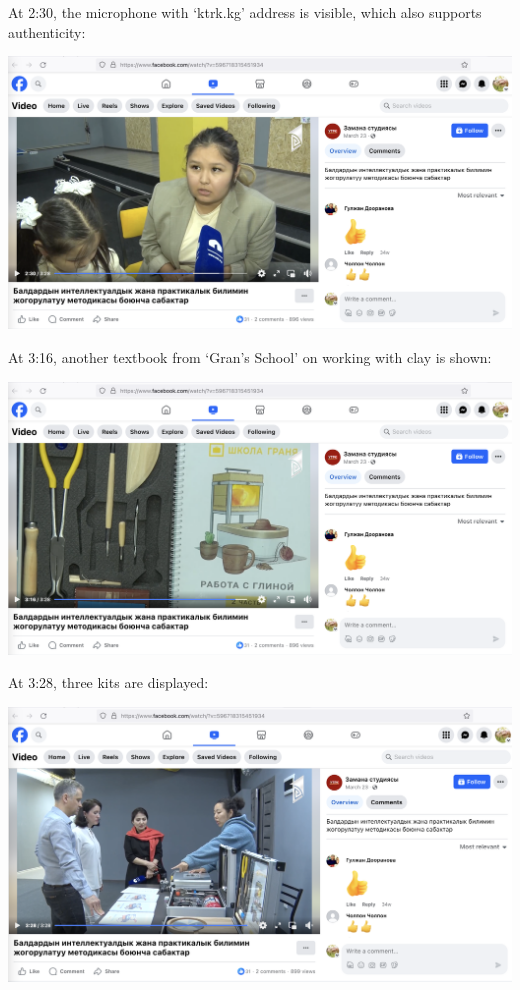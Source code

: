 

At 2:30, the microphone with `ktrk.kg' address is visible, which also supports authenticity:

\includegraphics[width=\textwidth]{2_30_girls}



At 3:16, another textbook from `Gran's School' on working with clay is shown:

\includegraphics[width=\textwidth]{3_16_book-clay}



At 3:28, three kits are displayed:

\includegraphics[width=\textwidth]{3_28_stand}







\pagebreak
